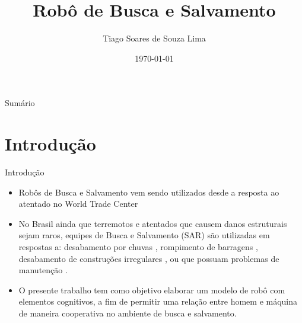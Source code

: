 \documentclass[aspectratio=169]{beamer}
\title{Robô de Busca e Salvamento}
\author{Tiago Soares de Souza Lima}
\institute{UNIFESP
	    \par
	    Sistemas Cognitivos Artificiais}
\date{\today}
\begin{document}
\begin{frame}


\titlepage

\end{frame}

\begin{frame}{Sumário}
\tableofcontents
\end{frame}

\section{Introdução}

\begin{frame}{Introdução}

\begin{itemize}
\item Robôs de Busca e Salvamento vem sendo utilizados desde a resposta ao atentado no World Trade Center \cite{Robin2004}
\item No Brasil ainda que terremotos e atentados que causem danos estruturais sejam raros, equipes de Busca e Salvamento (SAR) são utilizadas em respostas a: desabamento por chuvas \cite{serrana2022}, rompimento de barragens \cite{bruma2019}, desabamento de construções irregulares \cite{rio2021}, ou que possuam problemas de manutenção \cite{sp2020}.
\item O presente trabalho tem como objetivo elaborar um modelo de robô com elementos cognitivos, a fim de permitir uma relação entre homem e máquina de maneira cooperativa no ambiente de busca e salvamento.
\end{itemize}

\end{frame}
\end{document}
